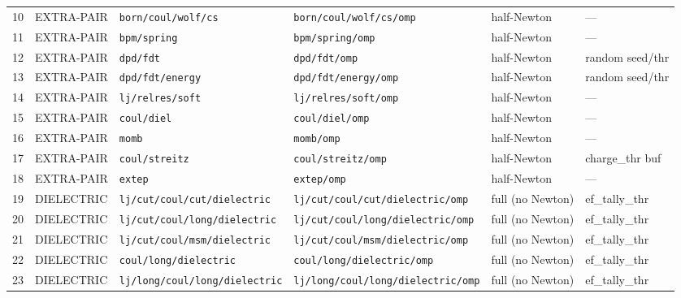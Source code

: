 \documentclass[
  11pt,
]{article}
\begin{document}
\begin{landscape}
\begin{longtable}{r l p{4.8cm} p{5.4cm} l p{3.2cm}}
10 & EXTRA-PAIR & \nolinkurl{born/coul/wolf/cs}             & \nolinkurl{born/coul/wolf/cs/omp}             & half-Newton      & ---                  \\
11 & EXTRA-PAIR & \nolinkurl{bpm/spring}                    & \nolinkurl{bpm/spring/omp}                    & half-Newton      & ---                  \\
12 & EXTRA-PAIR & \nolinkurl{dpd/fdt}                       & \nolinkurl{dpd/fdt/omp}                       & half-Newton      & random seed/thr      \\
13 & EXTRA-PAIR & \nolinkurl{dpd/fdt/energy}                & \nolinkurl{dpd/fdt/energy/omp}                & half-Newton      & random seed/thr      \\
14 & EXTRA-PAIR & \nolinkurl{lj/relres/soft}                & \nolinkurl{lj/relres/soft/omp}                & half-Newton      & ---                  \\
15 & EXTRA-PAIR & \nolinkurl{coul/diel}                     & \nolinkurl{coul/diel/omp}                     & half-Newton      & ---                  \\
16 & EXTRA-PAIR & \nolinkurl{momb}                          & \nolinkurl{momb/omp}                          & half-Newton      & ---                  \\
17 & EXTRA-PAIR & \nolinkurl{coul/streitz}                  & \nolinkurl{coul/streitz/omp}                  & half-Newton      & charge\_thr buf      \\
18 & EXTRA-PAIR & \nolinkurl{extep}                         & \nolinkurl{extep/omp}                         & half-Newton      & ---                  \\
19 & DIELECTRIC & \nolinkurl{lj/cut/coul/cut/dielectric}    & \nolinkurl{lj/cut/coul/cut/dielectric/omp}    & full (no Newton) & ef\_tally\_thr       \\
20 & DIELECTRIC & \nolinkurl{lj/cut/coul/long/dielectric}   & \nolinkurl{lj/cut/coul/long/dielectric/omp}   & full (no Newton) & ef\_tally\_thr       \\
21 & DIELECTRIC & \nolinkurl{lj/cut/coul/msm/dielectric}    & \nolinkurl{lj/cut/coul/msm/dielectric/omp}    & full (no Newton) & ef\_tally\_thr       \\
22 & DIELECTRIC & \nolinkurl{coul/long/dielectric}          & \nolinkurl{coul/long/dielectric/omp}          & full (no Newton) & ef\_tally\_thr       \\
23 & DIELECTRIC & \nolinkurl{lj/long/coul/long/dielectric}  & \nolinkurl{lj/long/coul/long/dielectric/omp}  & full (no Newton) & ef\_tally\_thr       \\

\end{longtable}
\end{landscape}
\end{document}
